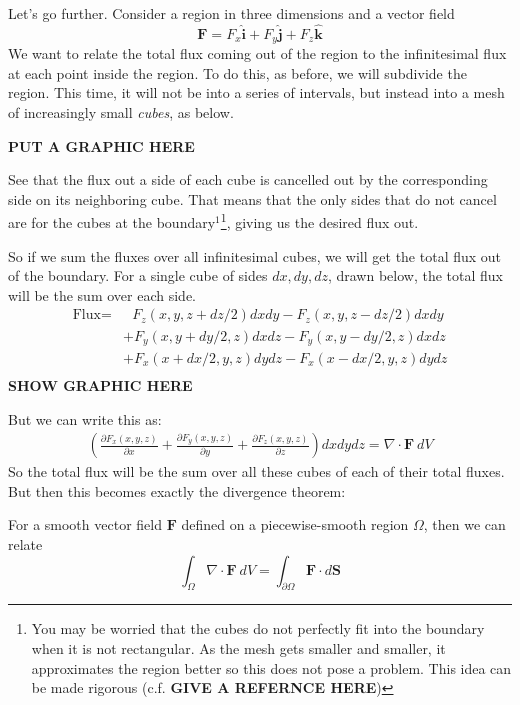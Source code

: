 	Let's go further. Consider a region in three dimensions and a vector field 
	\begin{equation*}
		\mathbf F = F_x \hat{\mathbf{i}} + F_y \hat{\mathbf j} + F_z \hat{\mathbf k}
	\end{equation*} 
	We want to relate the total flux coming out of the region to the infinitesimal flux at each point inside the region. To do this, as before, we will subdivide the region. This time, it will not be into a series of intervals, but instead into a mesh of increasingly small \emph{cubes}, as below.
	
	\textbf{PUT A GRAPHIC HERE}
	
	See that the flux out a side of each cube is cancelled out by the corresponding side on its neighboring cube. That means that the only sides that do not cancel are for the cubes at the boundary$^1$\footnote{You may be worried that the cubes do not perfectly fit into the boundary when it is not rectangular. As the mesh gets smaller and smaller, it approximates the region better so this does not pose a problem. This idea can be made rigorous (c.f. \textbf{GIVE A REFERNCE HERE})}, giving us the desired flux out.
	
	So if we sum the fluxes over all infinitesimal cubes, we will get the total flux out of the boundary. For a single cube of sides $dx,dy,dz$, drawn below, the total flux will be the sum over each side. 
	\begin{align*}
		\text{Flux} =&~~~  F_z(x,y,z+dz/2) dx dy -  F_z(x,y,z-dz/2) dx dy \\ 
						   & + F_y (x,y+dy/2,z) dx dz - F_y (x,y-dy/2,z) dx dz \\ 
						   & + F_x (x+dx/2,y,z) dy dz - F_x (x-dx/2,y,z) dy dz \\ 
	\end{align*}
	\textbf{SHOW GRAPHIC HERE}
	
	But we can write this as: 
	\begin{align*}
		\left( \frac{\partial F_x (x,y,z)}{\partial x} + \frac{\partial F_y (x,y,z)}{\partial y} + \frac{\partial F_z(x,y,z)}{\partial z} \right) dx dy dz = \nabla \cdot \mathbf F ~ dV
	\end{align*}
	So the total flux will be the sum over all these cubes of each of their total fluxes. But then this becomes exactly the divergence theorem:
	\begin{theorem}
	For a smooth vector field $\mathbf F$ defined on a piecewise-smooth region $\Omega$, then we can relate
		\begin{equation*}
			\int_\Omega \nabla \cdot \mathbf F ~ dV = \int_{\partial \Omega} \mathbf{F} \cdot d \mathbf S
		\end{equation*}
	\end{theorem}
	
